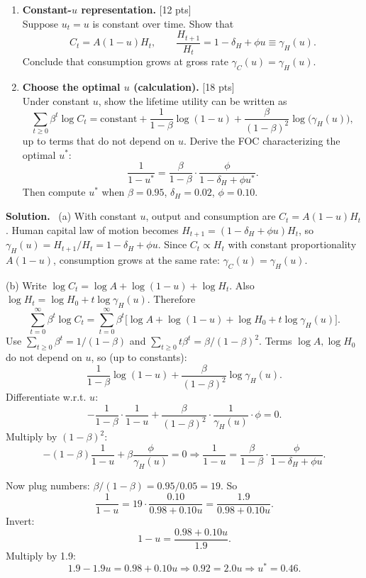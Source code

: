 \documentclass[12pt]{article}
\newenvironment{sol}{\par\medskip\noindent\textbf{Solution.}\ }{\par\medskip}
\newcommand{\pts}[1]{\hfill{\small[#1 pts]}}
\begin{document}
\begin{enumerate}[label=(\alph*)]
\item \textbf{Constant-\(u\) representation.} \pts{12}\\
Suppose \(u_t=u\) is constant over time. Show that
\[
C_t = A(1-u)H_t,\qquad
\frac{H_{t+1}}{H_t} = 1-\delta_H+\phi u \equiv \gamma_H(u).
\]
Conclude that consumption grows at gross rate \(\gamma_C(u)=\gamma_H(u)\).

\item \textbf{Choose the optimal \(u\) (calculation).} \pts{18}\\
Under constant \(u\), show the lifetime utility can be written as
\[
\sum_{t\ge 0}\beta^t \log C_t
=
\text{constant}
+
\frac{1}{1-\beta}\log(1-u)
+
\frac{\beta}{(1-\beta)^2}\log\big(\gamma_H(u)\big),
\]
up to terms that do not depend on \(u\).
Derive the FOC characterizing the optimal \(u^\ast\):
\[
\frac{1}{1-u^\ast} = \frac{\beta}{1-\beta}\cdot \frac{\phi}{1-\delta_H+\phi u^\ast}.
\]
Then compute \(u^\ast\) when \(\beta=0.95\), \(\delta_H=0.02\), \(\phi=0.10\).
\end{enumerate}

\begin{sol}
(a) With constant \(u\), output and consumption are \(C_t=A(1-u)H_t\).
Human capital law of motion becomes \(H_{t+1}=(1-\delta_H+\phi u)H_t\), so
\(\gamma_H(u)=H_{t+1}/H_t=1-\delta_H+\phi u\).
Since \(C_t\propto H_t\) with constant proportionality \(A(1-u)\), consumption grows at the same rate:
\(\gamma_C(u)=\gamma_H(u)\).

(b) Write \(\log C_t = \log A + \log(1-u) + \log H_t\).
Also \(\log H_t = \log H_0 + t\log\gamma_H(u)\).
Therefore
\[
\sum_{t=0}^\infty \beta^t \log C_t
=
\sum_{t=0}^\infty \beta^t \big[\log A + \log(1-u) + \log H_0 + t\log\gamma_H(u)\big].
\]
Use \(\sum_{t\ge0}\beta^t=1/(1-\beta)\) and \(\sum_{t\ge0} t\beta^t = \beta/(1-\beta)^2\).
Terms \(\log A,\log H_0\) do not depend on \(u\), so (up to constants):
\[
\frac{1}{1-\beta}\log(1-u) + \frac{\beta}{(1-\beta)^2}\log\gamma_H(u).
\]
Differentiate w.r.t. \(u\):
\[
-\frac{1}{1-\beta}\cdot \frac{1}{1-u} + \frac{\beta}{(1-\beta)^2}\cdot \frac{1}{\gamma_H(u)}\cdot \phi =0.
\]
Multiply by \((1-\beta)^2\):
\[
-(1-\beta)\frac{1}{1-u} + \beta \frac{\phi}{\gamma_H(u)}=0
\Rightarrow
\frac{1}{1-u} = \frac{\beta}{1-\beta}\cdot \frac{\phi}{1-\delta_H+\phi u}.
\]

Now plug numbers: \(\beta/(1-\beta)=0.95/0.05=19\).
So
\[
\frac{1}{1-u} = 19\cdot \frac{0.10}{0.98+0.10u}=\frac{1.9}{0.98+0.10u}.
\]
Invert:
\[
1-u = \frac{0.98+0.10u}{1.9}.
\]
Multiply by 1.9:
\[
1.9 - 1.9u = 0.98 + 0.10u
\Rightarrow 0.92 = 2.0u
\Rightarrow u^\ast=0.46.
\]
\end{sol}
\end{document}
